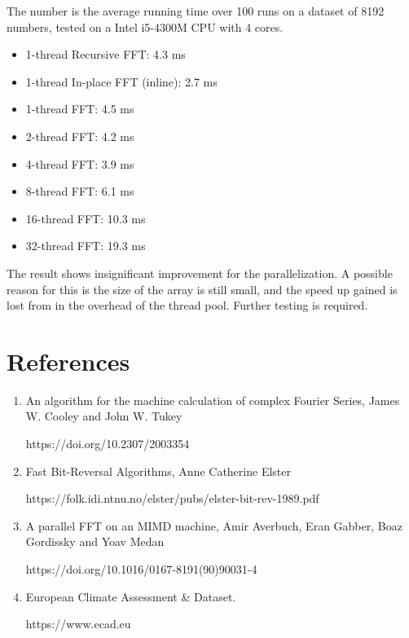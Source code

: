 \documentclass[10pt, letterpaper]{article}
\begin{document}
The number is the average running time over 100 runs on a dataset of 8192
numbers, tested on a Intel i5-4300M CPU with 4 cores.

\begin{itemize}
	\item 1-thread Recursive FFT: 4.3 ms
	\item 1-thread In-place FFT (inline): 2.7 ms
	\item 1-thread FFT: 4.5 ms
	\item 2-thread FFT: 4.2 ms
	\item 4-thread FFT: 3.9 ms
	\item 8-thread FFT: 6.1 ms
	\item 16-thread FFT: 10.3 ms
	\item 32-thread FFT: 19.3 ms
\end{itemize}

The result shows insignificant improvement for the parallelization. A
possible reason for this is the size of the array is still small, and the
speed up gained is lost from in the overhead of the thread pool. Further
testing is required.


\section{References}
\begin{enumerate}
	\item An algorithm for the machine calculation of complex Fourier
		Series, James W. Cooley and John W. Tukey

		https://doi.org/10.2307/2003354

	\item Fast Bit-Reversal Algorithms, Anne Catherine Elster

		https://folk.idi.ntnu.no/elster/pubs/elster-bit-rev-1989.pdf

	\item A parallel FFT on an MIMD machine, Amir Averbuch, Eran
		Gabber, Boaz Gordissky and Yoav Medan

		https://doi.org/10.1016/0167-8191(90)90031-4

	\item European Climate Assessment \& Dataset.

		https://www.ecad.eu
\end{enumerate}
\end{document}
